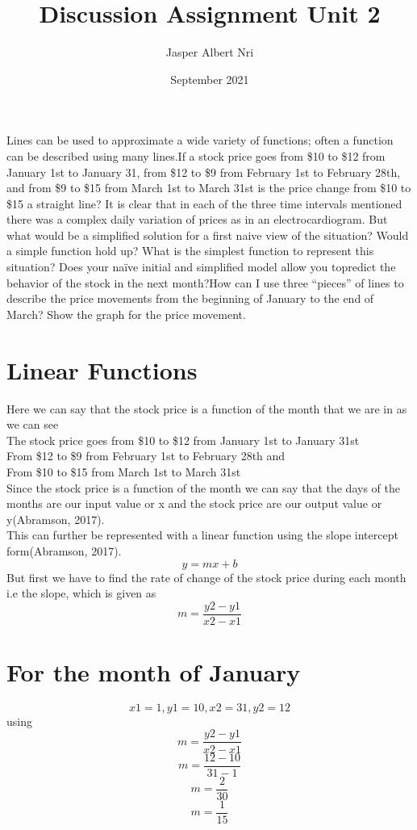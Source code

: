 \documentclass{article}
\title{Discussion Assignment Unit 2}
\author{Jasper Albert Nri}
\date{September 2021}
\begin{document}
\maketitle
Lines can be used to approximate a wide variety of functions; often a function can be described using many lines.If a stock price goes from \$10 to \$12 from January 1st to January 31, from \$12 to \$9 from February 1st to February 28th, and from \$9 to \$15 from March 1st to March 31st is the price change from \$10 to \$15 a straight line? It is clear that in each of the three time intervals mentioned there was a complex daily variation of prices as in an electrocardiogram. But what would be a simplified solution for a first naive view of the situation? Would a simple function hold up? What is the simplest function to represent this situation? Does your naïve initial and simplified model allow you topredict the behavior of the stock in the next month?How can I use three “pieces” of lines to describe the price movements from the beginning of January to the end of March? Show the graph for the price movement.

\section*{Linear Functions}
Here we can say that the stock price is a function of the month that we are in as we can see\\ 
The stock price goes from \$10 to \$12  from January 1st to January 31st \\
From \$12 to \$9 from February 1st to February 28th  and \\
From \$10 to \$15 from March 1st to March 31st  \\
Since the stock price is a function of the month we can say that the days of the months are our input value or x and the stock price are our output value or y(Abramson, 2017).\\

This can further be represented with a linear function using the slope intercept form(Abramson, 2017).  $${y=mx +b }$$
But first we have to find the rate of change of the stock price during each month i.e the slope, which is given as $${m=\frac{y2-y1}{x2-x1}}$$


\section *{\textbf {For the month of January}}
$${x1=1, y1=10, x2=31, y2=12}$$
using  $${m=\frac{y2-y1}{x2-x1}}$$
$${m=\frac{12-10}{31-1}}$$
$${m=\frac{2}{30}}$$
$${m=\frac{1}{15}}$$
\end{document}
